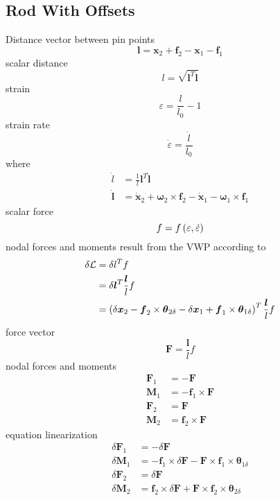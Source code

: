 \documentclass[10pt,dvips,fleqn]{report}
\newcommand{\T}[1]{\boldsymbol{#1}}
\begin{document}
\subsection{Rod With Offsets}
Distance vector between pin points
\begin{equation}
	\T{l} = \T{x}_2 + \T{f}_2 - \T{x}_1 - \T{f}_1
\end{equation}
scalar distance
\begin{equation}
	l = \sqrt{\T{l}^T \T{l}}
\end{equation}
strain
\begin{equation}
	\varepsilon = \frac{l}{l_0} - 1
\end{equation}
strain rate
\begin{equation}
	\dot{\varepsilon} = \frac{\dot{l}}{l_0}
\end{equation}
where
\begin{align}
	\dot{l} &= \frac{1}{l} \T{l}^T \dot{\T{l}} \\
	\dot{\T{l}} &= \dot{\T{x}}_2 + \T{\omega}_2 \times \T{f}_2
		- \dot{\T{x}}_1 - \T{\omega}_1 \times \T{f}_1
\end{align}
scalar force
\begin{equation}
	f = f\left( \varepsilon, \dot{\varepsilon} \right)
\end{equation}
nodal forces and moments result from the VWP according to
\begin{align}
	\delta \mathcal{L} &= \delta l^T f \\
	&= \delta\T{l}^T \frac{\T{l}}{l} f \\
	&= \plbr{
		\delta\T{x}_2
		- \T{f}_2 \times \T{\theta}_{2\delta}
		- \delta\T{x}_1
		+ \T{f}_1 \times \T{\theta}_{1\delta}
	}^T \frac{\T{l}}{l} f
\end{align}
force vector
\begin{equation}
	\T{F} = \frac{\T{l}}{l} f
\end{equation}
nodal forces and moments
\begin{align}
	\T{F}_1 &= -\T{F} \\
	\T{M}_1 &= -\T{f}_1 \times \T{F} \\
	\T{F}_2 &= \T{F} \\
	\T{M}_2 &= \T{f}_2 \times \T{F}
\end{align}
equation linearization
\begin{align}
	\delta\T{F}_1 &= -\delta\T{F} \\
	\delta\T{M}_1 &= -\T{f}_1 \times \delta\T{F} - \T{F}\times\T{f}_1\times \T{\theta}_{1\delta} \\
	\delta\T{F}_2 &= \delta\T{F} \\
	\delta\T{M}_2 &= \T{f}_2 \times \delta\T{F} + \T{F}\times\T{f}_2\times \T{\theta}_{2\delta}
\end{align}
\end{document}
